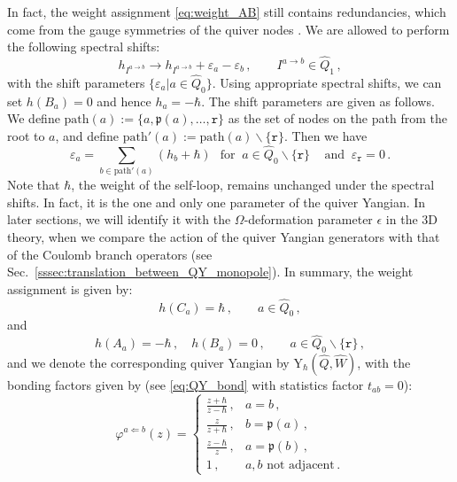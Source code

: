 \documentclass[12pt,a4paper]{article}
\renewcommand{\(}{\left(}
\renewcommand{\)}{\right)}
\renewcommand{\(}{\left(}
\renewcommand{\)}{\right)}
\begin{document}
In fact, the weight assignment \eqref{eq:weight_AB} still contains redundancies, which come from the gauge symmetries of the quiver nodes \cite{Li:2020rij}. 
We are allowed to perform the following spectral shifts:
\begin{equation}
h_{I^{a\to b}}\to h_{I^{a\to b}}+\varepsilon_a-\varepsilon_b\,,\qquad I^{a\to b}\in\widehat{Q}_1\,,
\end{equation}
with the shift parameters $\{\varepsilon_a|a\in\widehat{Q}_0\}$. 
Using appropriate spectral shifts, we can set $h(B_a)=0$ and hence ${h}_{a}=-\hbar$. 
The shift parameters are given as follows. 
We define $\textrm{path}(a):=\{a,\mathfrak{p}(a),\dots,\mathtt{r}\}$ as the set of nodes on the path from the root to $a$, and define $\textrm{path}'(a):=\textrm{path}(a)\backslash\{\mathtt{r}\}$. 
Then we have
\begin{equation}
\varepsilon_a=\sum_{b\in\textrm{path}'(a)} (h_b+\hbar)\,\ \text{ for }\ a\in\widehat{Q}_0\backslash\{\mathtt{r}\}\,  \quad\text{and }\ \varepsilon_{\mathtt{r}}=0\,.
\end{equation}
Note that $\hbar$, the weight of the self-loop, remains unchanged under the spectral shifts. 
In fact, it is the one and only one parameter of the quiver Yangian. In later sections, we will identify it with the $\Omega$-deformation parameter $\epsilon$ in the 3D theory, when we compare the action of the quiver Yangian generators with that of the Coulomb branch operators (see Sec.~\ref{sssec:translation_between_QY_monopole}). 
In summary, the weight assignment is given by:
\begin{equation}\label{eq:weight_assign_C}
h(C_a)=\hbar\,,\qquad a\in \widehat{Q}_0\,,
\end{equation}
and 
\begin{equation}\label{eq:weight_assign_AB}
h(A_a)=-\hbar\,,\quad h(B_a)=0 \,,\qquad a\in \widehat{Q}_0\backslash\{\mathtt{r}\}\,,
\end{equation}
and we denote the corresponding quiver Yangian by Y$_{\hbar}(\widehat{Q},\widehat{W})$, with the bonding factors given by (see \eqref{eq:QY_bond} with statistics factor $t_{ab}=0$):
\begin{equation}\label{eq:tree_bond}
\varphi^{a\Leftarrow b}(z)=\left\{
\begin{array}{cc}
\frac{z+\hbar}{z-\hbar} \,,  &a=b\,,  \\
\frac{z}{z+\hbar} \,, & b=\mathfrak{p}(a)\,,\\
\frac{z-\hbar}{z}\,,&a=\mathfrak{p}(b)\,,\\
1\,,&a,b\text{ not adjacent}\,.
\end{array}\right.
\end{equation}
\end{document}
